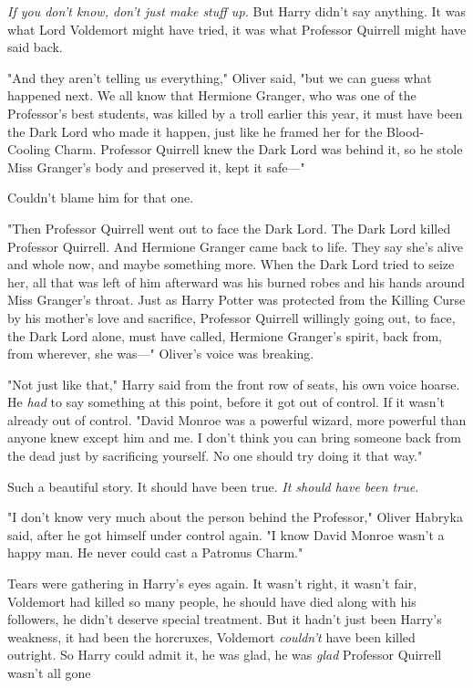 \emph{If you don't know, don't just make stuff up.} But Harry didn't say
anything. It was what Lord Voldemort might have tried, it was what Professor
Quirrell might have said back.

"And they aren't telling us everything," Oliver said, "but we can guess what
happened next. We all know that Hermione Granger, who was one of the
Professor's best students, was killed by a troll earlier this year, it must
have been the Dark Lord who made it happen, just like he framed her for the
Blood-Cooling Charm. Professor Quirrell knew the Dark Lord was behind it, so he
stole Miss Granger's body and preserved it, kept it safe—"

Couldn't blame him for that one.

"Then Professor Quirrell went out to face the Dark Lord. The Dark Lord killed
Professor Quirrell. And Hermione Granger came back to life. They say she's
alive and whole now, and maybe something more. When the Dark Lord tried to
seize her, all that was left of him afterward was his burned robes and his
hands around Miss Granger's throat. Just as Harry Potter was protected from the
Killing Curse by his mother's love and sacrifice, Professor Quirrell willingly
going out, to face, the Dark Lord alone, must have called, Hermione Granger's
spirit, back from, from wherever, she was—" Oliver's voice was breaking.

"Not just like that," Harry said from the front row of seats, his own voice
hoarse. He \emph{had} to say something at this point, before it got out of
control. If it wasn't already out of control. "David Monroe was a powerful
wizard, more powerful than anyone knew except him and me. I don't think you can
bring someone back from the dead just by sacrificing yourself. No one should
try doing it that way."

Such a beautiful story. It should have been true. \emph{It should have been
true.}

"I don't know very much about the person behind the Professor," Oliver Habryka
said, after he got himself under control again. "I know David Monroe wasn't a
happy man. He never could cast a Patronus Charm."

Tears were gathering in Harry's eyes again. It wasn't right, it wasn't fair,
Voldemort had killed so many people, he should have died along with his
followers, he didn't deserve special treatment. But it hadn't just been Harry's
weakness, it had been the horcruxes, Voldemort \emph{couldn't} have been killed
outright. So Harry could admit it, he was glad, he was \emph{glad} Professor
Quirrell wasn't all gone{\el}


